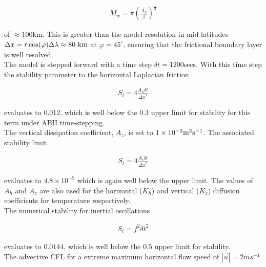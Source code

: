 \begin{eqnarray}
\label{eq:eg-fourlayer-munk_layer}
M_{w} = \pi ( \frac { A_{h} }{ \beta } )^{\frac{1}{3}}
\end{eqnarray}

\noindent  of $\approx 100$km. This is greater than the model
resolution in mid-latitudes 
$\Delta x=r \cos(\varphi) \Delta \lambda \approx 80~{\rm km}$ at
$\varphi=45^{\circ}$, ensuring that the frictional 
boundary layer is well resolved.
\\

\noindent The model is stepped forward with a 
time step $\delta t=1200$secs. With this time step the stability 
parameter to the horizontal Laplacian friction

\begin{eqnarray}
\label{eq:eg-fourlayer-laplacian_stability}
S_{l} = 4 \frac{A_{h} \delta t}{{\Delta x}^2}
\end{eqnarray}

\noindent evaluates to 0.012, which is well below the 0.3 upper limit
for stability for this term under ABII time-stepping.
\\

\noindent The vertical dissipation coefficient, $A_{z}$, is set to 
$1\times10^{-2} {\rm m}^2{\rm s}^{-1}$. The associated stability limit

\begin{eqnarray}
\label{eq:eg-fourlayer-laplacian_stability_z}
S_{l} = 4 \frac{A_{z} \delta t}{{\Delta z}^2}
\end{eqnarray}

\noindent evaluates to $4.8 \times 10^{-5}$ which is again well below
the upper limit.
The values of $A_{h}$ and $A_{z}$ are also used for the horizontal ($K_{h}$) 
and vertical ($K_{z}$) diffusion coefficients for temperature respectively.
\\

\noindent The numerical stability for inertial oscillations

\begin{eqnarray}
\label{eq:eg-fourlayer-inertial_stability}
S_{i} = f^{2} {\delta t}^2
\end{eqnarray}

\noindent evaluates to $0.0144$, which is well below the $0.5$ upper 
limit for stability.
\\

\noindent The advective CFL for a extreme maximum 
horizontal flow
speed of $ | \vec{u} | = 2 ms^{-1}$

